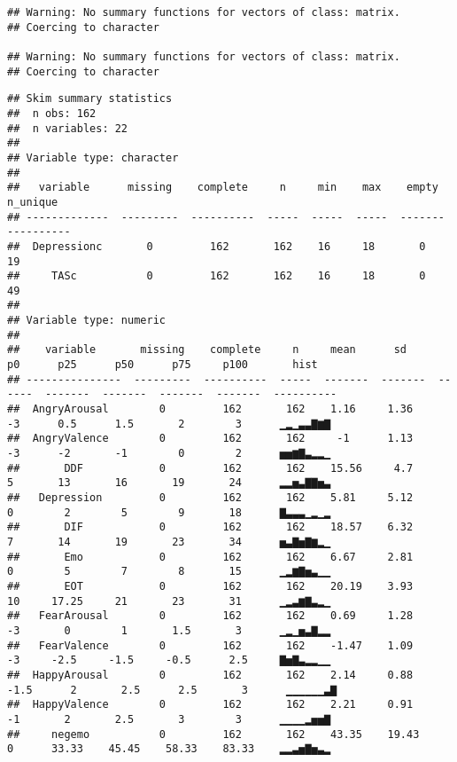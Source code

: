 \documentclass[]{article}
\begin{document}
\begin{verbatim}
## Warning: No summary functions for vectors of class: matrix.
## Coercing to character

## Warning: No summary functions for vectors of class: matrix.
## Coercing to character
\end{verbatim}

\begin{verbatim}
## Skim summary statistics  
##  n obs: 162    
##  n variables: 22    
## 
## Variable type: character
## 
##   variable      missing    complete     n     min    max    empty    n_unique 
## -------------  ---------  ----------  -----  -----  -----  -------  ----------
##  Depressionc       0         162       162    16     18       0         19    
##     TASc           0         162       162    16     18       0         49    
## 
## Variable type: numeric
## 
##    variable       missing    complete     n     mean      sd       p0      p25      p50      p75     p100       hist   
## ---------------  ---------  ----------  -----  -------  -------  ------  -------  -------  -------  -------  ----------
##  AngryArousal        0         162       162    1.16     1.36      -3      0.5      1.5       2        3      ▁▂▁▃▃▇▆▇ 
##  AngryValence        0         162       162     -1      1.13      -3      -2       -1        0        2      ▅▅▆▇▃▂▂▁ 
##       DDF            0         162       162    15.56     4.7      5       13       16       19       24      ▂▂▅▃▇▇▅▃ 
##   Depression         0         162       162    5.81     5.12      0        2        5        9       18      ▇▃▃▃▁▂▁▂ 
##       DIF            0         162       162    18.57    6.32      7       14       19       23       34      ▅▃▇▅▇▆▂▁ 
##       Emo            0         162       162    6.67     2.81      0        5        7        8       15      ▁▂▆▇▅▃▁▁ 
##       EOT            0         162       162    20.19    3.93      10     17.25     21       23       31      ▁▂▃▆▇▃▂▁ 
##   FearArousal        0         162       162    0.69     1.28      -3       0        1       1.5       3      ▁▂▁▅▃▇▂▂ 
##   FearValence        0         162       162    -1.47    1.09      -3     -2.5     -1.5     -0.5      2.5     ▇▅▇▃▂▂▁▁ 
##  HappyArousal        0         162       162    2.14     0.88     -1.5      2       2.5      2.5       3      ▁▁▁▁▁▁▃▇ 
##  HappyValence        0         162       162    2.21     0.91      -1       2       2.5       3        3      ▁▁▁▁▂▅▅▇ 
##     negemo           0         162       162    43.35    19.43     0      33.33    45.45    58.33    83.33    ▂▂▃▅▇▅▃▂ 

\end{verbatim}
\end{document}
